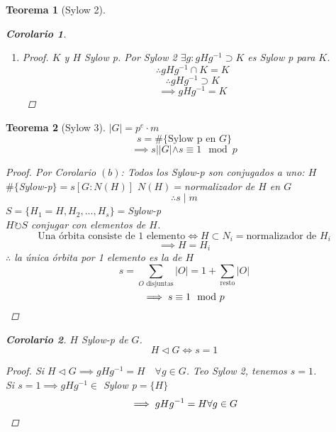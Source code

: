 \documentclass[11pt]{book}
\newtheorem{thm}{Teorema}[section]
\newtheorem*{cor}{Corolario}
\theoremstyle{definition}
\begin{document}
\begin{thm}[Sylow 2]
\begin{cor}
\begin{enumerate}[label=(\alph*)]
			\item \begin{proof}
				$K$ y $H$ Sylow p. Por Sylow 2 $\exists g:gHg^{-1}\supset K$ es Sylow p para $K$.
				\[\therefore gHg^{-1}\cap K=K\]
				\[\therefore gHg^{-1}\supset K\]
				\[\implies gHg^{-1}=K\]
			\end{proof}
		\end{enumerate}
	\end{cor}
\end{thm}
\begin{thm}[Sylow 3]
	$|G|=p^e\cdot m$
	\[s=\#\{\textrm{Sylow p en }G\}\]
	\[\implies s ||G|\wedge s\equiv 1\mod p\]
	\begin{proof}
		Por Corolario $(b)$: Todos los Sylow-p son conjugados a uno: $H$\\
		$\#\{$Sylow-p$\}=s[G:N(H)]$ $N(H)=$normalizador de $H$ en $G$
		\[\therefore s\mid m\]
		$S=\{H_1=H,H_2,...,H_s\}=$Sylow-p\\
		$H\circlearrowright S$ conjugar con elementos de $H$.
		\[\textrm{Una órbita consiste de 1 elemento}\iff H\subset N_i=\textrm{normalizador de }H_i\]
		\[\implies H=H_i\]
		$\therefore$ la única órbita por 1 elemento es la de $H$
		\[s=\sum_{O\textrm{ disjuntas}}|O|=1+\sum_{\textrm{resto}}|O|\]
		\[\implies s\equiv 1\mod p\qedhere\]
	\end{proof}
	\begin{cor}
		$H$ Sylow-p de $G$.
		\[H\triangleleft G\iff s=1\]
		\begin{proof}
			Si $H\triangleleft G\implies gHg^{-1}=H\quad\forall g\in G$. Teo Sylow 2, tenemos $s=1$.\\
			Si $s=1\implies gHg^{-1}\in$ Sylow p$=\{H\}$
			\[\implies gHg^{-1}=H\forall g\in G\qedhere\]
		\end{proof}
	\end{cor}
\end{thm}
\end{document}
